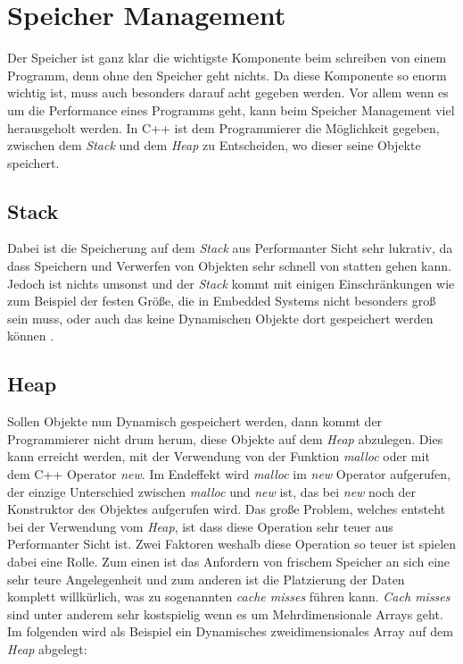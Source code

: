 \section{Speicher Management}
Der Speicher ist ganz klar die wichtigste Komponente beim schreiben von einem Programm, denn ohne
den Speicher geht nichts. Da diese Komponente so enorm wichtig ist, muss auch besonders darauf
acht gegeben werden. Vor allem wenn es um die Performance eines Programms geht, kann beim
Speicher Management viel herausgeholt werden. In C++ ist dem Programmierer die Möglichkeit
gegeben, zwischen dem \emph{Stack} und dem \emph{Heap} zu Entscheiden, wo dieser seine Objekte
speichert.

\subsection{Stack}
Dabei ist die Speicherung auf dem \emph{Stack} aus Performanter Sicht sehr lukrativ, da dass
Speichern und Verwerfen von Objekten sehr schnell von statten gehen kann. Jedoch ist nichts
umsonst und der \emph{Stack} kommt mit einigen Einschränkungen wie zum Beispiel der festen Größe,
die in Embedded Systems nicht besonders groß sein muss, oder auch das keine Dynamischen Objekte
dort gespeichert werden können \cite{C++HighPer2}.

\subsection{Heap}
Sollen Objekte nun Dynamisch gespeichert werden, dann kommt der Programmierer nicht drum herum,
diese Objekte auf dem \emph{Heap} abzulegen. Dies kann erreicht werden, mit der Verwendung von
der Funktion \emph{malloc} oder mit dem C++ Operator \emph{new}. Im Endeffekt wird \emph{malloc}
im \emph{new} Operator aufgerufen, der einzige Unterschied zwischen \emph{malloc} und \emph{new}
ist, das bei \emph{new} noch der Konstruktor des Objektes aufgerufen wird. Das große Problem,
welches entsteht bei der Verwendung vom \emph{Heap}, ist dass diese Operation sehr teuer aus
Performanter Sicht ist. Zwei Faktoren weshalb diese Operation so teuer ist spielen dabei eine
Rolle. Zum einen ist das Anfordern von frischem Speicher an sich eine sehr teure Angelegenheit
und zum anderen ist die Platzierung der Daten komplett willkürlich, was zu sogenannten
\emph{cache misses} führen kann.
\newline
\newline
\emph{Cach misses} sind unter anderem sehr kostspielig wenn es um Mehrdimensionale Arrays geht.
Im folgenden wird als Beispiel ein Dynamisches zweidimensionales Array auf dem \emph{Heap} abgelegt:

